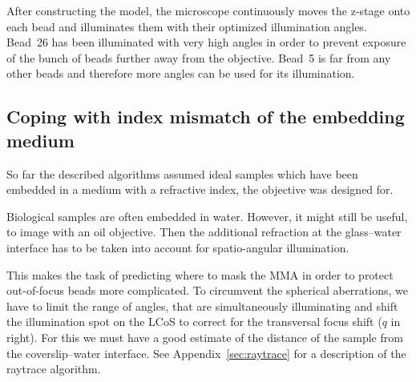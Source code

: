 After constructing the model, the microscope continuously moves the
z-stage onto each bead and illuminates them with their optimized
illumination angles. Bead~26 has been illuminated with very high
angles in order to prevent exposure of the bunch of beads further away
from the objective. Bead~5 is far from any other beads and therefore
more angles can be used for its illumination.










\subsection{Coping with index mismatch of the embedding medium}
So far the described algorithms assumed ideal samples which have been
embedded in a medium with a refractive index, the objective was
designed for.

Biological samples are often embedded in water. However, it might
still be useful, to image with an oil objective. Then the additional
refraction at the glass--water interface has to be taken into account
for spatio-angular illumination.

This makes the task of predicting where to mask the MMA in order to
protect out-of-focus beads more complicated. To circumvent the
spherical aberrations, we have to limit the range of angles, that are
simultaneously illuminating and shift the illumination spot on the
LCoS to correct for the transversal focus shift ($q$ in
 right). For this we must have a good
estimate of the distance of the sample from the coverslip--water
interface. See Appendix~\ref{sec:raytrace} for a description of the
raytrace algorithm.

